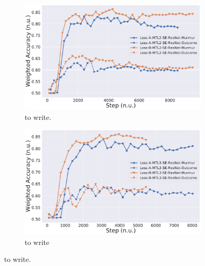 
\begin{figure}
\centering
\begin{subfigure}[b]{0.49\linewidth}
    \centering
    \includegraphics[width=\textwidth]{images/clf-se-resnet-lossA-vs-lossB.pdf}
    \caption[]
    {to write.}
    \label{fig:clf-se-resnet-lossA-vs-lossB}
\end{subfigure}
\hfill
\begin{subfigure}[b]{0.49\linewidth}
    \centering
    \includegraphics[width=\textwidth]{images/mtl-se-resnet-lossA-vs-lossB.pdf}
    \caption[]
    {to write}
    \label{fig:mtl-se-resnet-lossA-vs-lossB.pdf}
\end{subfigure}
\caption[]
{to write.}
\label{fig:loss}
\end{figure}
